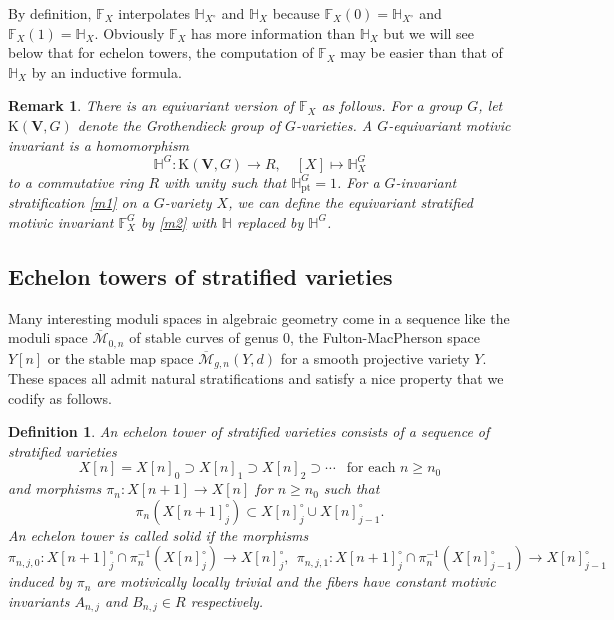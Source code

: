 \documentclass[11pt]{amsart}
\newtheorem{remark}[theorem]{Remark}
\newtheorem{definition}[theorem]{Definition}
\newcommand{\Mbarzn}{\overline{\mathcal M}_{0,n}}
\newcommand{\Mbargn}{\overline{\mathcal M}_{g,n}}
\def\lra{\longrightarrow}
\def\beq{\begin{equation}}
\def\eeq{\end{equation}}
\def\HH{\mathbb{H}}
\def\FF{\mathbb{F}}
\def\KVG{\mathrm{K}(\mathbf{V},G)}
\begin{document}
By definition, $\FF_X$ interpolates $\HH_{X^\circ}$ and $\HH_{X}$ because 
$\FF_X(0)=\HH_{X^\circ}$ and $\FF_X(1)=\HH_X$.
Obviously $\FF_{X}$ has more information than $\HH_X$ but we will see below that for echelon towers, the computation of $\FF_{X}$ may be easier than that of $\HH_X$ by an inductive formula. 

\begin{remark} There is an equivariant version of $\FF_X$ as follows. 
For a group $G$, let $\KVG$ denote the Grothendieck group of $G$-varieties. A \emph{$G$-equivariant motivic invariant} is a homomorphism 
$$\HH^G:\KVG\lra R, \quad [X]\mapsto \HH^G_X$$
to a commutative ring $R$ with unity such that $\HH^G_{\mathrm{pt}}=1$. 
For a $G$-invariant stratification \eqref{m1} on a $G$-variety $X$, we can define the \emph{equivariant stratified motivic invariant} $\FF^G_{X}$ by \eqref{m2} with $\HH$ replaced by $\HH^G$. 
\end{remark}


\subsection{Echelon towers of stratified varieties}
Many interesting moduli spaces in algebraic geometry come in a sequence like the moduli space $\Mbarzn$ of stable curves of genus $0$, the Fulton-MacPherson space $Y[n]$ or the stable map space $\Mbargn(Y,d)$ for a smooth projective variety $Y$.   
These spaces all admit natural stratifications and satisfy a nice property that we codify as follows. 

\begin{definition}\label{m19} An \emph{echelon tower} of stratified varieties consists of 
    a sequence of stratified varieties
        $$X[n]=X[n]_0\supset X[n]_1\supset X[n]_2\supset \cdots\ \ \text{ for each  }n\ge n_0$$ and morphisms $\pi_n:X[n+1]\to X[n]$ for $n\ge n_0$
    such that 
        $$\pi_{n}(X[n+1]_j^\circ)\subset X[n]_j^\circ\cup X[n]_{j-1}^\circ.$$
An echelon tower is called \emph{solid} if the morphisms   
\beq\label{m3}\pi_{n,j,0}:X[n+1]_j^\circ\cap \pi_n^{-1}(X[n]_j^\circ)\lra X[n]_j^\circ, \ \ 
\pi_{n,j,1}:X[n+1]_j^\circ\cap \pi_n^{-1}(X[n]_{j-1}^\circ)\lra X[n]_{j-1}^\circ\eeq 
induced by $\pi_n$ are motivically locally trivial and the fibers have constant motivic invariants $A_{n,j}$ and $B_{n,j}\in R$ respectively.
\end{definition}
\end{document}
